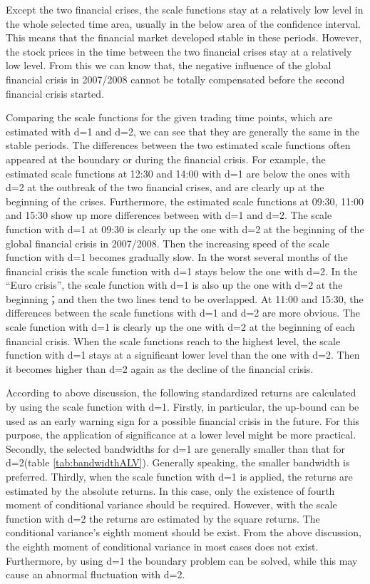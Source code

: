 Except the two financial crises, the scale functions stay at a relatively low level in the whole selected time area, usually in the below area of the confidence interval. This means that the financial market developed stable in these periods. However, the stock prices in the time between the two financial crises stay at a relatively low level. From this we can know that, the negative influence of the global financial crisis in 2007/2008 cannot be totally compensated before the second financial crisis started. 

Comparing the scale functions for the given trading time points, which are estimated with d=1 and d=2, we can see that they are generally the same in the stable periods. The differences between the two estimated scale functions often appeared at the boundary or during the financial crisis. For example, the estimated scale functions at 12:30 and 14:00 with d=1 are below the ones with d=2 at the outbreak of the two financial crises, and are clearly up at the beginning of the crises. 
Furthermore, the estimated scale functions at 09:30, 11:00 and 15:30 show up more differences between with d=1 and d=2. The scale function with d=1 at 09:30 is clearly up the one with d=2 at the beginning of the global financial crisis in 2007/2008. Then the increasing speed of the scale function with d=1 becomes gradually slow. In the worst several months of the financial crisis the scale function with d=1 stays below the one with d=2. In the ``Euro crisis'', the scale function with d=1 is also up the one with d=2 at the beginning；and then the two lines tend to be overlapped. At 11:00 and 15:30, the differences between the scale functions with d=1 and d=2 are more obvious. The scale function with d=1 is clearly up the one with d=2 at the beginning of each financial crisis. When the scale functions reach to the highest level, the scale function with d=1 stays at a significant lower level than the one with d=2. Then it becomes higher than d=2 again as the decline of the financial crisis.

According to above discussion, the following standardized returns are calculated by using the scale function with d=1. Firstly, in particular, the up-bound can be used as an early warning sign for a possible financial crisis in the future. For this purpose, the application of significance at a lower level might be more practical. Secondly, the selected bandwidths for d=1 are generally smaller than that for d=2(table \ref{tab:bandwidthALV}). Generally speaking, the smaller bandwidth is preferred. Thirdly, when the scale function with d=1 is applied, the returns are estimated by the absolute returns. In this case, only the existence of fourth moment of conditional variance should be required. However, with the scale function with d=2 the returns are estimated by the square returns. The conditional variance’s eighth moment should be exist. From the above discussion, the eighth moment of conditional variance in most cases does not exist. Furthermore, by using d=1 the boundary problem can be solved, while this may cause an abnormal fluctuation with d=2.


